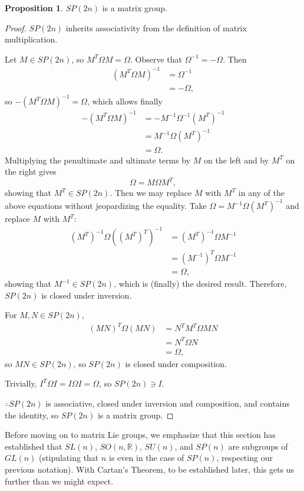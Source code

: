 \documentclass[12pt]{article}
\newcommand{\R}{\mathbb{R}}
\newcommand{\sun}{SU (n)}
\newcommand{\son}{SO (n, \R)}
\newcommand{\Om}{\Omega}
\theoremstyle{definition}
\newtheorem{prop}[them]{Proposition}
\theoremstyle{definition}
\theoremstyle{definition}
\theoremstyle{definition}
\theoremstyle{definition}
\theoremstyle{definition}
\theoremstyle{definition}
\theoremstyle{definition}
\begin{document}
\begin{prop}$SP(2n)$ is a matrix group.\end{prop}
\begin{proof}
\par{$SP(2n)$ inherits associativity from the definition of matrix multiplication.}
\par{Let $M \in SP(2n)$, so $M^T \Om M = \Om$.
Observe that $\Om^{-1} = -\Om$. Then \[\begin{aligned}{(M^T \Om
M)}^{-1} & = \Om^{-1} \\ & = -\Om,\end{aligned}\] so $-{(M^T \Om
M)}^{-1} = \Om$, which allows finally
\[\begin{aligned}
    -{(M^T \Om M)}^{-1} & = -M^{-1} \Om^{-1}
    {(M^T)}^{-1} \\ & = M^{-1} \Om {(M^T)}^{-1} \\
    & = \Om.
\end{aligned}\] Multiplying the penultimate and ultimate terms by $M$ on the left and by $M^T$ on the right gives
\[
    \Om = M \Om M^T,
\] showing that $M^T \in SP(2n)$. Then we may replace $M$ with $M^T$ in any of the above equations without jeopardizing the equality. Take $\Om = M^{-1}\Om{(M^T)}^{-1}$ and replace $M$ with $M^T$:
\[\begin{aligned}
{(M^T)}^{-1} \Om {({(M^T)}^T)}^{-1} & =
{(M^T)}^{-1} \Om M^{-1} \\
& = {(M^{-1})}^T \Om M^{-1} \\ & = \Om,
\end{aligned}\] showing that $M^{-1} \in
SP(2n)$, which is (finally) the desired
result. Therefore, $SP(2n)$ is closed under
inversion.}
\par{For $M, N \in SP(2n)$,
\[\begin{aligned}
{(MN)}^T \Om (MN) & = N^T M^T \Om M N \\ & =
N^T \Om N \\ & = \Om,
\end{aligned}\] so $MN \in SP(2n)$, so $SP(2n)$ is closed under composition.
}
\par{Trivially, $I^T\Om I = I \Om I =  \Om$, so $SP(2n) \ni I$.}
\par{$\therefore SP(2n)$ is associative, closed under inversion and composition, and contains the identity, so $SP(2n)$ is a matrix group.}
\end{proof}

\par{Before moving on to matrix Lie groups, we
emphasize that this section has established that
$SL(n)$, $\son$, $\sun$, and $SP(n)$ are
subgroups of $GL(n)$ (stipulating that $n$ is even
in the case of $SP(n)$, respecting our previous
notation). With Cartan’s Theorem, to be
established later, this gets us further than
we might expect.}
\end{document}
